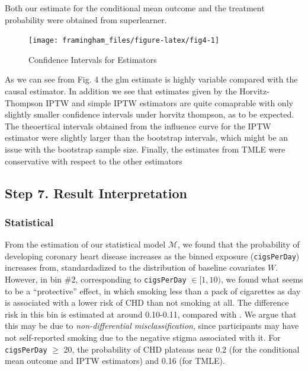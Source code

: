 \documentclass[]{article}
\begin{document}
Both our estimate for the conditional mean outcome and the treatment
probability were obtained from superlearner.

\begin{figure}[H]

{\centering \texttt{[image: framingham\_files/figure-latex/fig4-1]} 

}

\caption{Confidence Intervals for Estimators}\label{fig:fig4}
\end{figure}

As we can see from Fig. 4 the glm estimate is highly variable compared
with the causal estimator. In addition we see that estimates given by
the Horvitz-Thompson IPTW and simple IPTW estimators are quite
comaprable with only slightly smaller confidence intervals under horvitz
thompson, as to be expected. The theoertical intervals obtained from the
influence curve for the IPTW estimator were slightly larger than the
bootstrap intervals, which might be an issue with the bootstrap sample
size. Finally, the estimates from TMLE were conservative with respect to
the other estimators

\subsection{Step 7. Result
Interpretation}\label{step-7.-result-interpretation}

\subsubsection{Statistical}\label{statistical}

From the estimation of our statistical model \(\mathcal{M}\), we found
that the probability of developing coronary heart disease increases as
the binned exposure (\texttt{cigsPerDay}) increases from, standardadized
to the distribution of baseline covariates \(W\). However, in bin \#2,
corresponding to \texttt{cigsPerDay} \(\in [1, 10)\), we found what
seems to be a ``protective'' effect, in which smoking less than a pack
of cigarettes as day is associated with a lower risk of CHD than not
smoking at all. The difference risk in this bin is estimated at around
0.10-0.11, compared with . We argue that this may be due to
\textit{non-differential misclassification}, since participants may have
not self-reported smoking due to the negative stigma associated with it.
For \texttt{cigsPerDay} \(\geq\) 20, the probability of CHD plateaus
near 0.2 (for the conditional mean outcome and IPTW estimators) and 0.16
(for TMLE).
\end{document}
